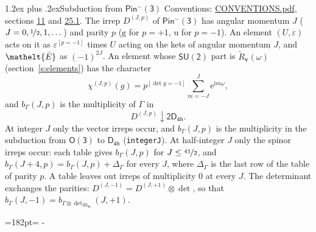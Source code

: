 \documentclass[10pt,a4paper]{article}
\makeatletter
\renewcommand\section{\@startsection{section}{1}{\z@}{-3ex plus -1ex minus -.2ex}%
  {1.2ex plus .2ex}{\normalfont\large\sffamily\bfseries\color{parttitle}}}
\newcommand{\needspace}[1]{\par\penalty-100\begingroup\dimen0=#1\relax\dimen2=\pagegoal
  \advance\dimen2-\pagetotal\ifdim\dimen0>\dimen2\relax\ifdim\dimen2>0pt\vfil\break\fi\fi
  \endgroup}
\numberwithin{equation}{section}
\newcommand{\eltfont}[1]{{\let\sigma\eltsigma\mathelt{#1}}}
\newcommand{\grp}[1]{\mathsf{#1}}
\newcommand{\elt}[1]{\eltfont{#1}}
\newcommand{\ptag}[1]{\mathrm{#1}}
\newcommand{\iverson}[1]{[#1]}
\newcommand{\restr}[2]{#1\!\downarrow#2}
\newcommand{\vv}{\mathbf{v}}
\newcommand{\iunit}{\mathrm{i}}
\newcommand{\expe}{\mathrm{e}}
\newcommand{\irrJp}[2]{D^{(#1,#2)}}
\newcommand{\irrprod}{\otimes}
\newcommand{\barred}[1]{\bar{#1}}
\newcommand{\lift}[1]{\tilde{#1}}
\makeatother
\begin{document}
\section{Subduction from \texorpdfstring{$\grp{Pin^{-}(3)}$}{Pin(3)}}\label{s:subduction_parent}
Conventions: \href{../../CONVENTIONS.pdf}{CONVENTIONS.pdf}, sections \href{../../../rotation/CONVENTIONS.pdf\#conv.11}{11} and \href{../../CONVENTIONS.pdf\#conv.25.1}{25.1}.
\leavevmode\label{n:index.J}\label{n:index.parity}\label{n:irrep.o3}The irrep $\irrJp{J}{p}$ of \href{Pinminus3.pdf}{$\grp{Pin^{-}(3)}$} has angular momentum $J$ ($J = 0, \nicefrac{1}{2}, 1, \dots$) and parity $p$ ($\ptag{g}$ for $p = +1$, $\ptag{u}$ for $p = -1$). An element $(U, \varepsilon)$ acts on it as $\varepsilon^{[p = -1]}$ times $U$ acting on the kets of angular momentum $J$, and $\elt{\barred{E}}$ as $(-1)^{2J}$. \label{n:function.character.parent}\label{n:function.multiplicity}An element whose $\grp{SU(2)}$ part is $\lift{R}_{\vv}(\omega)$ (section~\ref{s:elements}) has the character
\begin{equation}\label{e:chi}\chi^{(J,p)}(g) = p^{\iverson{\det g = -1}}\sum_{m=-J}^{J} \expe^{\iunit m\omega},\end{equation}
and $b_\Gamma(J, p)$ is the multiplicity of $\Gamma$ in
\begin{equation}\label{e:parent}\restr{\irrJp{J}{p}}{\grp{2D_{4h}}}.\end{equation}
At integer $J$ only the vector irreps occur, and $b_\Gamma(J, p)$ is the multiplicity in the subduction from $\grp{O(3)}$ to \href{../../../rotation/data/pdf/D4h.pdf}{$\grp{D_{4h}}$} (\texttt{integerJ}). \label{n:index.increment}At half-integer $J$ only the spinor irreps occur: each table gives $b_\Gamma(J, p)$ for $J \le \nicefrac{41}{2}$, and $b_\Gamma(J + 4, p) = b_\Gamma(J, p) + \Delta_\Gamma$ for every $J$, where $\Delta_\Gamma$ is the last row of the table of parity $p$. A table leaves out irreps of multiplicity 0 at every $J$.
\leavevmode\label{n:operator.determinant.character}The determinant exchanges the parities: $\irrJp{J}{-1} = \irrJp{J}{+1} \irrprod \det$, so that $b_\Gamma(J, -1) = b_{\Gamma \irrprod \det_{\grp{2D_{4h}}}}(J, +1)$.
\needspace{182pt}
\end{document}
